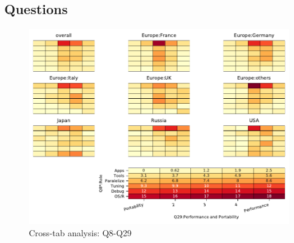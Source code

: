 
\subsection{Questions}


\begin{figure}
\begin{center}
\includegraphics[width=12cm]{../pdfs/Q8-Q29.pdf}
\caption{Cross-tab analysis: Q8-Q29}
\label{fig:Q8-Q29}
\end{center}
\end{figure}
